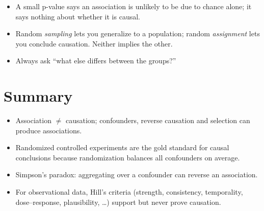 \begin{important}
\begin{itemize}
  \item A small p-value says an association is unlikely to be due to chance alone; it
        says nothing about whether it is causal.
  \item Random \emph{sampling} lets you generalize to a population; random
        \emph{assignment} lets you conclude causation. Neither implies the other.
  \item Always ask ``what else differs between the groups?''
\end{itemize}
\end{important}

\section*{Summary}
\begin{itemize}
  \item Association $\ne$ causation; confounders, reverse causation and selection can
        produce associations.
  \item Randomized controlled experiments are the gold standard for causal conclusions
        because randomization balances all confounders on average.
  \item Simpson's paradox: aggregating over a confounder can reverse an association.
  \item For observational data, Hill's criteria (strength, consistency, temporality,
        dose--response, plausibility, \ldots) support but never prove causation.
\end{itemize}
